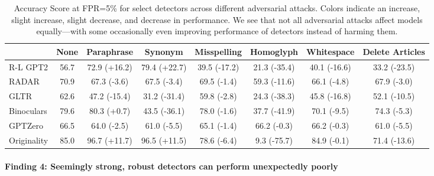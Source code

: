 \documentclass[11pt]{article}
\begin{document}
\begin{table}[t]
    \small
    \centering
    \begin{tabular}{l|c|c|c|c|c|c|c}
    \toprule
    &\textbf{None}&\textbf{Paraphrase}&\textbf{Synonym}&\textbf{Misspelling}&\textbf{Homoglyph}&\textbf{Whitespace}&\textbf{Delete Articles}\\
    \midrule
    R-L GPT2&56.7&72.9 ({\color{blue}+16.2})&79.4 ({\color{blue}+22.7})&39.5 ({\color{darkred}-17.2})&21.3 ({\color{darkred}-35.4})&40.1 ({\color{darkred}-16.6})&33.2 ({\color{darkred}-23.5})\\
    RADAR&70.9&67.3 ({\color{lightred}-3.6})&67.5 ({\color{lightred}-3.4})&69.5 ({\color{lightred}-1.4})&59.3 ({\color{darkred}-11.6})&66.1 ({\color{lightred}-4.8})&67.9 ({\color{lightred}-3.0})\\
    GLTR&62.6&47.2 ({\color{darkred}-15.4})&31.2 ({\color{darkred}-31.4})&59.8 ({\color{lightred}-2.8})&24.3 ({\color{darkred}-38.3})&45.8 ({\color{darkred}-16.8})&52.1 ({\color{darkred}-10.5})\\
    Binoculars&79.6&80.3 ({\color{cyan}+0.7})&43.5 ({\color{darkred}-36.1})&78.0 ({\color{lightred}-1.6})&37.7 ({\color{darkred}-41.9})&70.1 ({\color{lightred}-9.5})&74.3 ({\color{lightred}-5.3})\\
    GPTZero&66.5&64.0 ({\color{lightred}-2.5})&61.0 ({\color{lightred}-5.5})&65.1 ({\color{lightred}-1.4})&66.2 ({\color{lightred}-0.3})&66.2 ({\color{lightred}-0.3})&61.0 ({\color{lightred}-5.5})\\
    Originality&85.0&96.7 ({\color{blue}+11.7})&96.5 ({\color{blue}+11.5})&78.6 ({\color{lightred}-6.4})&9.3 ({\color{darkred}-75.7})&84.9 ({\color{lightred}-0.1})&71.4 ({\color{darkred}-13.6})\\
    \bottomrule
    \end{tabular}
    \caption{Accuracy Score at FPR=5\% for select detectors across different adversarial attacks. Colors indicate an {\color{blue}increase}, {\color{cyan}slight increase}, {\color{lightred}slight decrease}, and {\color{darkred}decrease} in performance. We see that not all adversarial attacks affect models equally---with some occasionally even improving performance of detectors instead of harming them.}
    \label{tab:adversarial_comparison}
\end{table}

\paragraph{Finding 4: Seemingly strong, robust detectors can perform unexpectedly poorly}
\end{document}
